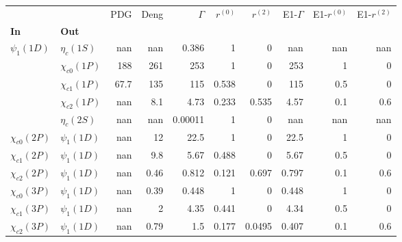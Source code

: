 \begin{tabular}{l|l|r|r|r|r|r|r|r|r}
\toprule
                &                &  PDG &  Deng &  $\Gamma$ &  $r^{(0)}$ &  $r^{(2)}$ &  E1-$\Gamma$ &  E1-$r^{(0)}$ &  E1-$r^{(2)}$ \\
\textbf{In} & \textbf{Out} &      &       &           &            &            &              &               &               \\
\midrule
\textbf{$\psi_{1}(1D)$} & \textbf{$\eta_{c}(1S)$} &  nan &   nan &     0.386 &          1 &          0 &          nan &           nan &           nan \\
                & \textbf{$\chi_{c0}(1P)$} &  188 &   261 &       253 &          1 &          0 &          253 &             1 &             0 \\
                & \textbf{$\chi_{c1}(1P)$} & 67.7 &   135 &       115 &      0.538 &          0 &          115 &           0.5 &             0 \\
                & \textbf{$\chi_{c2}(1P)$} &  nan &   8.1 &      4.73 &      0.233 &      0.535 &         4.57 &           0.1 &           0.6 \\
                & \textbf{$\eta_{c}(2S)$} &  nan &   nan &   0.00011 &          1 &          0 &          nan &           nan &           nan \\
\textbf{$\chi_{c0}(2P)$} & \textbf{$\psi_{1}(1D)$} &  nan &    12 &      22.5 &          1 &          0 &         22.5 &             1 &             0 \\
\textbf{$\chi_{c1}(2P)$} & \textbf{$\psi_{1}(1D)$} &  nan &   9.8 &      5.67 &      0.488 &          0 &         5.67 &           0.5 &             0 \\
\textbf{$\chi_{c2}(2P)$} & \textbf{$\psi_{1}(1D)$} &  nan &  0.46 &     0.812 &      0.121 &      0.697 &        0.797 &           0.1 &           0.6 \\
\textbf{$\chi_{c0}(3P)$} & \textbf{$\psi_{1}(1D)$} &  nan &  0.39 &     0.448 &          1 &          0 &        0.448 &             1 &             0 \\
\textbf{$\chi_{c1}(3P)$} & \textbf{$\psi_{1}(1D)$} &  nan &     2 &      4.35 &      0.441 &          0 &         4.34 &           0.5 &             0 \\
\textbf{$\chi_{c2}(3P)$} & \textbf{$\psi_{1}(1D)$} &  nan &  0.79 &       1.5 &      0.177 &     0.0495 &        0.407 &           0.1 &           0.6 \\
\bottomrule
\end{tabular}
